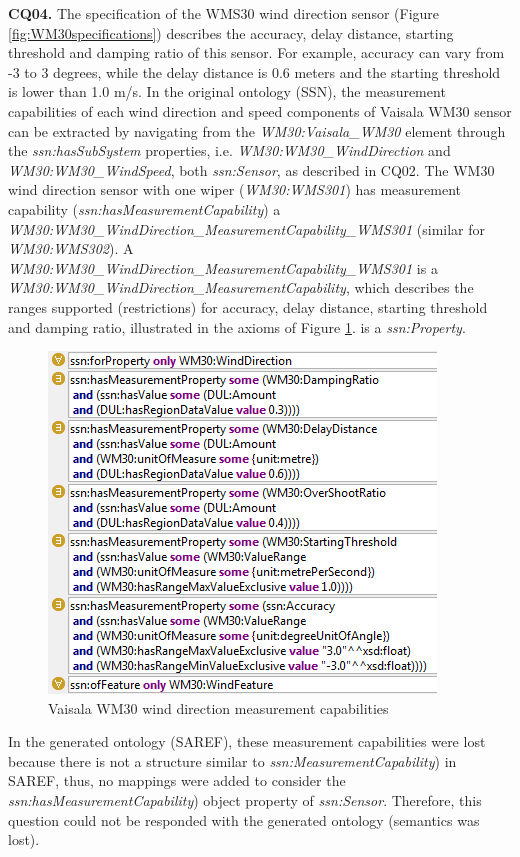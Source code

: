 \documentclass{sig-alternate-05-2015}
\begin{document}
\textbf{CQ04.} The specification of the WMS30 wind direction sensor (Figure \ref{fig:WM30specifications}) describes the accuracy, delay distance, starting threshold and damping ratio of this sensor. For example, accuracy can vary from -3 to 3 degrees, while the delay distance is 0.6 meters and the starting threshold is lower than 1.0 m/s. 
In the original ontology (SSN), the measurement capabilities of each wind direction and speed components  of Vaisala WM30 sensor can be extracted by navigating from the \textit{WM30:Vaisala\_WM30} element through the \textit{ssn:hasSubSystem} properties, i.e. \textit{WM30:WM30\_WindDirection} and \textit{WM30:WM30\_WindSpeed}, both \textit{ssn:Sensor}, as described in CQ02. The WM30 wind direction sensor with one wiper (\textit{WM30:WMS301}) has measurement capability (\textit{ssn:hasMeasurementCapability}) a  \textit{WM30:WM30\_WindDirection\_MeasurementCapability\_WMS301} (similar for \textit{WM30:WMS302}). A \textit{WM30:WM30\_WindDirection\_MeasurementCapability\_WMS301} is a \textit{WM30:WM30\_WindDirection\_MeasurementCapability}, which describes the ranges supported (restrictions) for accuracy, delay distance, starting threshold and damping ratio, illustrated in the axioms of Figure \ref{fig:SSN_MeasurementCapability}.  is a \textit{ssn:Property}. 

\begin{figure}[h!]
\centering
\includegraphics[scale=0.87]{SSN_MeasurementCapability}
\caption{Vaisala WM30 wind direction measurement capabilities} 
\label{fig:SSN_MeasurementCapability}
\end{figure}

In the generated ontology (SAREF), these measurement capabilities were lost because there is not a structure similar to \textit{ssn:MeasurementCapability}) in SAREF, thus, no mappings were added to consider the  \textit{ssn:hasMeasurementCapability}) object property of \textit{ssn:Sensor}. Therefore, this question could not be responded with the generated ontology (semantics was lost).  
\end{document}
